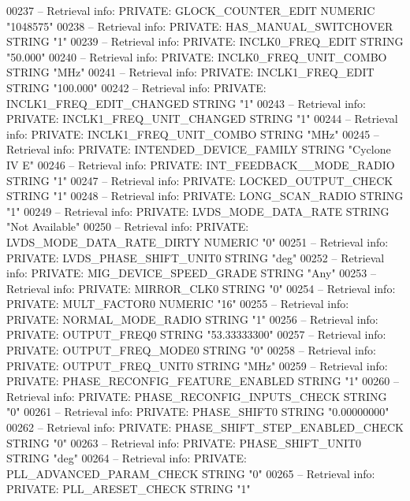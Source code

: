 \begin{DoxyCode}
{00237 \textcolor{keyword}{-- Retrieval info: PRIVATE: GLOCK\_COUNTER\_EDIT NUMERIC "1048575"}
00238 \textcolor{keyword}{-- Retrieval info: PRIVATE: HAS\_MANUAL\_SWITCHOVER STRING "1"}
00239 \textcolor{keyword}{-- Retrieval info: PRIVATE: INCLK0\_FREQ\_EDIT STRING "50.000"}
00240 \textcolor{keyword}{-- Retrieval info: PRIVATE: INCLK0\_FREQ\_UNIT\_COMBO STRING "MHz"}
00241 \textcolor{keyword}{-- Retrieval info: PRIVATE: INCLK1\_FREQ\_EDIT STRING "100.000"}
00242 \textcolor{keyword}{-- Retrieval info: PRIVATE: INCLK1\_FREQ\_EDIT\_CHANGED STRING "1"}
00243 \textcolor{keyword}{-- Retrieval info: PRIVATE: INCLK1\_FREQ\_UNIT\_CHANGED STRING "1"}
00244 \textcolor{keyword}{-- Retrieval info: PRIVATE: INCLK1\_FREQ\_UNIT\_COMBO STRING "MHz"}
00245 \textcolor{keyword}{-- Retrieval info: PRIVATE: INTENDED\_DEVICE\_FAMILY STRING "Cyclone IV E"}
00246 \textcolor{keyword}{-- Retrieval info: PRIVATE: INT\_FEEDBACK\_\_MODE\_RADIO STRING "1"}
00247 \textcolor{keyword}{-- Retrieval info: PRIVATE: LOCKED\_OUTPUT\_CHECK STRING "1"}
00248 \textcolor{keyword}{-- Retrieval info: PRIVATE: LONG\_SCAN\_RADIO STRING "1"}
00249 \textcolor{keyword}{-- Retrieval info: PRIVATE: LVDS\_MODE\_DATA\_RATE STRING "Not Available"}
00250 \textcolor{keyword}{-- Retrieval info: PRIVATE: LVDS\_MODE\_DATA\_RATE\_DIRTY NUMERIC "0"}
00251 \textcolor{keyword}{-- Retrieval info: PRIVATE: LVDS\_PHASE\_SHIFT\_UNIT0 STRING "deg"}
00252 \textcolor{keyword}{-- Retrieval info: PRIVATE: MIG\_DEVICE\_SPEED\_GRADE STRING "Any"}
00253 \textcolor{keyword}{-- Retrieval info: PRIVATE: MIRROR\_CLK0 STRING "0"}
00254 \textcolor{keyword}{-- Retrieval info: PRIVATE: MULT\_FACTOR0 NUMERIC "16"}
00255 \textcolor{keyword}{-- Retrieval info: PRIVATE: NORMAL\_MODE\_RADIO STRING "1"}
00256 \textcolor{keyword}{-- Retrieval info: PRIVATE: OUTPUT\_FREQ0 STRING "53.33333300"}
00257 \textcolor{keyword}{-- Retrieval info: PRIVATE: OUTPUT\_FREQ\_MODE0 STRING "0"}
00258 \textcolor{keyword}{-- Retrieval info: PRIVATE: OUTPUT\_FREQ\_UNIT0 STRING "MHz"}
00259 \textcolor{keyword}{-- Retrieval info: PRIVATE: PHASE\_RECONFIG\_FEATURE\_ENABLED STRING "1"}
00260 \textcolor{keyword}{-- Retrieval info: PRIVATE: PHASE\_RECONFIG\_INPUTS\_CHECK STRING "0"}
00261 \textcolor{keyword}{-- Retrieval info: PRIVATE: PHASE\_SHIFT0 STRING "0.00000000"}
00262 \textcolor{keyword}{-- Retrieval info: PRIVATE: PHASE\_SHIFT\_STEP\_ENABLED\_CHECK STRING "0"}
00263 \textcolor{keyword}{-- Retrieval info: PRIVATE: PHASE\_SHIFT\_UNIT0 STRING "deg"}
00264 \textcolor{keyword}{-- Retrieval info: PRIVATE: PLL\_ADVANCED\_PARAM\_CHECK STRING "0"}
00265 \textcolor{keyword}{-- Retrieval info: PRIVATE: PLL\_ARESET\_CHECK STRING "1"}
}
\end{DoxyCode}
